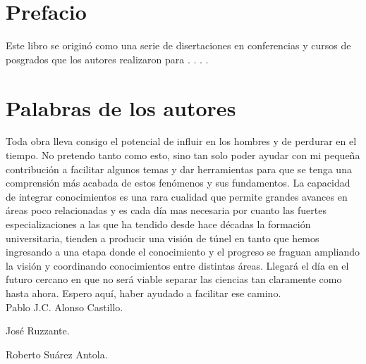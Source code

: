 \documentclass[
11pt, %
spanish,
singlespacing, %
parskip, %
headsepline, %
]{MastersDoctoralThesis} %
\begin{document}
\chapter*{Prefacio}


{\larger
\hspace{20mm} Este libro se originó como una serie de disertaciones en conferencias y cursos de posgrados que los autores realizaron para . . . .
}

\chapter*{Palabras de los autores}


\hspace{20mm}Toda obra lleva consigo el potencial de influir en los hombres y de perdurar en el tiempo. No pretendo tanto como esto, sino tan solo poder ayudar con mi pequeña contribución a facilitar  algunos temas y dar herramientas para que se tenga una comprensión más acabada de estos fenómenos y sus fundamentos. La capacidad de integrar conocimientos es una rara cualidad que permite grandes avances en áreas poco relacionadas y es cada día mas necesaria por cuanto las fuertes especializaciones a las que ha tendido desde hace décadas la formación universitaria, tienden a producir una visión de túnel en tanto que hemos ingresando a una etapa donde el conocimiento y el progreso se fraguan ampliando la visión y coordinando conocimientos entre distintas áreas. Llegará el día en el futuro cercano en que no será viable separar las ciencias tan claramente como hasta ahora. Espero aquí, haber ayudado a facilitar ese camino.\\


\hspace{9.0cm}Pablo J.C. Alonso Castillo.\\

\vspace{10mm}


\hspace{9.0cm}José Ruzzante.\\

\vspace{10mm}
	
	

\hspace{9.0cm}Roberto Suárez Antola.\\
\end{document}
